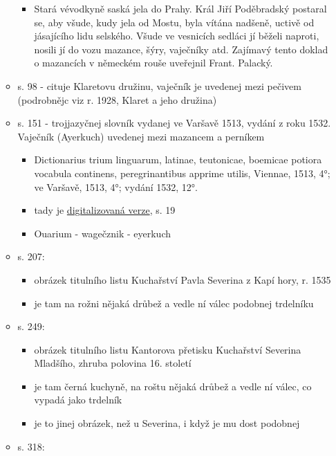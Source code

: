 \begin{itemize}
\begin{itemize}
    \begin{itemize}
    \tightlist
    \item
      Stará vévodkyně saská jela do Prahy. Král Jiří Poděbradský
      postaral se, aby všude, kudy jela od Mostu, byla vítána nadšeně,
      uctivě od jásajícího lidu selského. Všude ve vesnicích sedláci jí
      běželi naproti, nosili jí do vozu mazance, šýry, vaječníky atd.
      Zajímavý tento doklad o mazancích v německém rouše uveřejnil
      Frant. Palacký.
    \end{itemize}
  \item
    s. 98 - cituje Klaretovu družinu, vaječník je uvedenej mezi pečivem
    (podrobnějc viz r. 1928, Klaret a jeho družina)
  \item
    s. 151 - trojjazyčnej slovník vydanej ve Varšavě 1513, vydání z roku
    1532. Vaječník (Ayerkuch) uvedenej mezi mazancem a perníkem

    \begin{itemize}
    \tightlist
    \item
      Dictionarius trium linguarum, latinae, teutonicae, boemicae
      potiora vocabula continens, peregrinantibus apprime utilis,
      Viennae, 1513, 4°; ve Varšavě, 1513, 4°; vydání 1532, 12°.
    \item
      tady je
      \href{https://dbc.wroc.pl/dlibra/publication/33643/edition/30385/content?ref=L3B1YmxpY2F0aW9uLzM0Njg5L2VkaXRpb24vMzE0MTQ}{digitalizovaná
      verze}, s. 19
    \item
      Ouarium - wagečznik - eyerkuch
    \end{itemize}
  \item
    s. 207:

    \begin{itemize}
    \tightlist
    \item
      obrázek titulního listu Kuchařství Pavla Severina z Kapí hory, r.
      1535
    \item
      je tam na rožni nějaká drůbež a vedle ní válec podobnej trdelníku
    \end{itemize}
  \item
    s. 249:

    \begin{itemize}
    \tightlist
    \item
      obrázek titulního listu Kantorova přetisku Kuchařství Severina
      Mladšího, zhruba polovina 16. století
    \item
      je tam černá kuchyně, na roštu nějaká drůbež a vedle ní válec, co
      vypadá jako trdelník
    \item
      je to jinej obrázek, než u Severina, i když je mu dost podobnej
    \end{itemize}
  \item
    s. 318:


\end{itemize}
\end{itemize}
